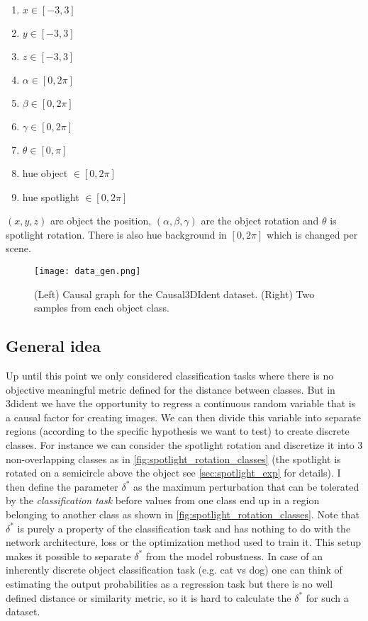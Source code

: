 \documentclass[../thesis.tex]{subfiles}
\begin{document}
\begin{multicols}{3}
\begin{enumerate}
	\item $x \in [-3, 3]$
	\item $y \in [-3, 3]$
	\item $z \in[-3, 3]$
	\item $\alpha \in [0, 2\pi]$
	\item $\beta \in [0, 2\pi]$
	\item $\gamma \in [0, 2\pi]$
	\item $\theta \in [0, \pi]$
	\item hue object $\in [0, 2\pi]$
	\item hue spotlight $\in[0, 2\pi]$
\end{enumerate}
\end{multicols}
$(x,y,z)$ are object the position, $(\alpha, \beta, \gamma)$ are the object rotation and $\theta$ is spotlight rotation. There is also hue background in $[0, 2\pi]$ which is changed per scene.



\begin{figure}[h!]
	\centering	
	\texttt{[image: data\_gen.png]}
	\caption{(Left) Causal graph for the Causal3DIdent dataset. (Right) Two samples from each object class.}
	\label{fig:3dident_explain}
\end{figure}




\subsection{General idea}
\label{sec:3dident_general_idea}

Up until this point we only considered classification tasks where there is no objective meaningful metric defined for the distance between classes. But in 3dident we have the opportunity to regress a continuous random variable that is a causal factor for creating images. We can then divide this variable into separate regions (according to the specific hypothesis we want to test) to create discrete classes. For instance we can consider the spotlight rotation and discretize it into 3 non-overlapping classes as in \ref{fig:spotlight_rotation_classes} (the spotlight is rotated on a semicircle above the object see \ref{sec:spotlight_exp} for details). I then define the parameter \textbf{$\delta^*$} as the maximum perturbation that can be tolerated by the \textit{classification task} before values from one class end up in a region belonging to another class as shown in \ref{fig:spotlight_rotation_classes}. Note that $\delta^*$ is purely a property of the classification task and has nothing to do with the network architecture, loss or the optimization method used to train it. This setup makes it possible to separate $\delta^*$ from the model robustness. In case of an inherently discrete object classification task (e.g. cat vs dog) one can think of estimating the output probabilities as a regression task but there is no well defined distance or similarity metric, so it is hard to calculate the $\delta^*$ for such a dataset.
\end{document}
